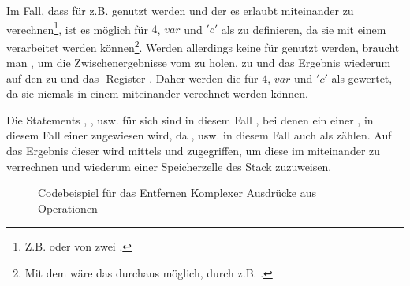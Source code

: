Im Fall, dass  für z.B.  genutzt werden und der  es erlaubt  miteinander zu verechnen\footnote{Z.B.  oder  von zwei .}, ist es möglich  für  $4$,  $var$ und  $'c'$ als  zu definieren, da sie mit einem  verarbeitet werden können\footnote{Mit dem  wäre das durchaus möglich, durch z.B. .}. Werden allerdings keine  für  genutzt werden, braucht man , um die Zwischenergebnisse vom  zu holen, zu  und das Ergebnis wiederum auf den  zu  und das -Register . Daher werden die  für  $4$,  $var$ und  $'c'$ als  gewertet, da sie niemals in einem  miteinander verechnet werden können.

Die Statements , , usw. für sich sind in diesem Fall , bei denen ein  einer , in diesem Fall einer  zugewiesen wird, da ,  usw. in diesem Fall auch als   zählen. Auf das Ergebnis dieser  wird mittels  und  zugegriffen, um diese im   miteinander zu verrechnen und wiederum einer Speicherzelle des Stack zuzuweisen.

\begin{figure}[H]
  \hfill

  \caption{Codebeispiel für das Entfernen Komplexer Ausdrücke aus Operationen}
  \label{fig:example_remove_complex_operands}
\end{figure}

